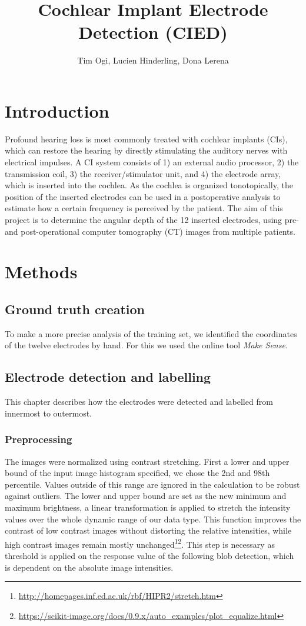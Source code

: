 \documentclass[a4paper, 10pt, twocolumn]{article}
\title{\textbf{Cochlear Implant Electrode Detection (CIED)}}
\author{Tim Ogi, Lucien Hinderling, Dona Lerena}
\begin{document}
\maketitle
\section{Introduction}
Profound hearing loss is most commonly treated with cochlear implants (CIs), which can restore the hearing by directly stimulating the auditory nerves with electrical impulses. A CI system consists of 1) an external audio processor, 2) the transmission coil, 3) the receiver/stimulator unit, and 4) the electrode array, which is inserted into the cochlea. As the cochlea is organized tonotopically, the position of the inserted electrodes can be used in a postoperative analysis to estimate how a certain frequency is perceived by the patient. The aim of this project is to determine the angular depth of the 12 inserted electrodes, using pre- and post-operational computer tomography (CT) images from multiple patients.


\section{Methods}
\subsection{Ground truth creation}
To make a more precise analysis of the training set, we identified the coordinates of the twelve electrodes by hand. For this we used the online tool  \emph{Make Sense}\cite{makesense}. 
\subsection{Electrode detection and labelling}
This chapter describes how the electrodes were detected and labelled from innermost to outermost.
\subsubsection{Preprocessing}
The images were normalized using contrast stretching. First a lower and upper bound of the input image histogram specified, we chose the 2nd and 98th percentile. Values outside of this range are ignored in the calculation to be robust against outliers. The lower and upper bound are set as the new minimum and maximum brightness, a linear transformation is applied to stretch the intensity values over the whole dynamic range of our data type. This function improves the contrast of low contrast images without distorting the relative intensities, while high contrast images remain mostly unchanged\footnote{\url{http://homepages.inf.ed.ac.uk/rbf/HIPR2/stretch.htm}}\footnote{\url{https://scikit-image.org/docs/0.9.x/auto_examples/plot_equalize.html}}. This step is necessary as threshold is applied on the response value of the following blob detection, which is dependent on the absolute image intensities.
\end{document}
